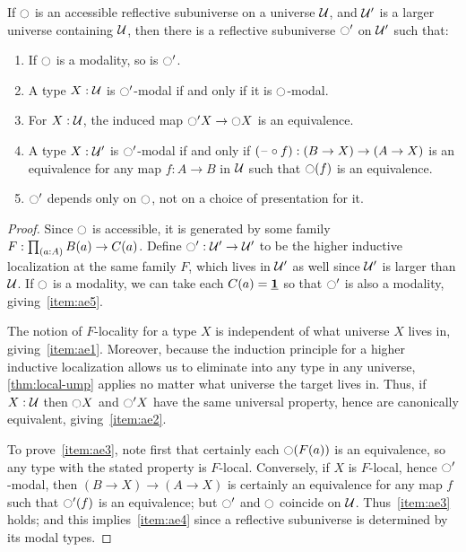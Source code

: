 \begin{lem}\label{thm:acc-extend}
  If ${\ocircle}$ is an accessible reflective subuniverse on a universe $\mathcal{U}$, and $\mathcal{U}'$ is a larger universe containing $\mathcal{U}$, then there is a reflective subuniverse ${\ocircle}'$ on $\mathcal{U}'$ such that:
  \begin{enumerate}
  \item If ${\ocircle}$ is a modality, so is ${\ocircle}'$.\label{item:ae5}
  \item A type $X:\mathcal{U}$ is ${\ocircle}'$-modal if and only if it is ${\ocircle}$-modal.\label{item:ae1}
  \item For $X:\mathcal{U}$, the induced map ${\ocircle}' X \to {\ensuremath{\ocircle}} X$ is an equivalence.\label{item:ae2}
  \item A type $X:\mathcal{U}'$ is ${\ocircle}'$-modal if and only if $(\mathord{\hspace{1pt}\text{--}\hspace{1pt}}\circ f) : (B\to X) \to (A\to X)$ is an equivalence for any map $f:A\to B$ in $\mathcal{U}$ such that ${\ocircle}(f)$ is an equivalence.\label{item:ae3}
  \item ${\ocircle}'$ depends only on ${\ocircle}$, not on a choice of presentation for it.\label{item:ae4}
  \end{enumerate}
\end{lem}
\begin{proof}
  Since ${\ocircle}$ is accessible, it is generated by some family $F:\prd{a:A} B(a) \to C(a)$.
  Define ${\ocircle}':\mathcal{U}'\to\mathcal{U}'$ to be the higher inductive localization at the same family $F$, which lives in $\mathcal{U}'$ as well since $\mathcal{U}'$ is larger than $\mathcal{U}$.
  If ${\ocircle}$ is a modality, we can take each $C(a)=\underline{\mathbf{1}}$ so that ${\ocircle}'$ is also a modality, giving~\ref{item:ae5}.

  The notion of $F$-locality for a type $X$ is independent of what universe $X$ lives in, giving~\ref{item:ae1}.
  Moreover, because the induction principle for a higher inductive localization allows us to eliminate into any type in any universe, \cref{thm:local-ump} applies no matter what universe the target lives in.
  Thus, if $X:\mathcal{U}$ then ${\ocircle} X$ and ${\ocircle}' X$ have the same universal property, hence are canonically equivalent, giving~\ref{item:ae2}.

  To prove~\ref{item:ae3}, note first that certainly each ${\ocircle} (F(a))$ is an equivalence, so any type with the stated property is $F$-local.
  Conversely, if $X$ is $F$-local, hence ${\ocircle}'$-modal, then $(B\to X) \to (A\to X)$ is certainly an equivalence for any map $f$ such that ${\ocircle}'(f)$ is an equivalence; but ${\ocircle}'$ and ${\ocircle}$ coincide on $\mathcal{U}$.
  Thus~\ref{item:ae3} holds; and this implies~\ref{item:ae4} since a reflective subuniverse is determined by its modal types.
\end{proof}

